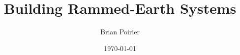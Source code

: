 \documentclass{article}
\begin{document}
\title{Building Rammed-Earth Systems}
\author{Brian Poirier}
\date{\today}
\maketitle
\clearpage

\tableofcontents
\clearpage



\clearpage










\printbibliography
\end{document}
